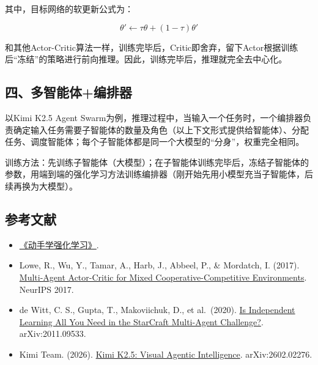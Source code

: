 其中，目标网络的软更新公式为：

\[
\theta'
\leftarrow
\tau\theta+(1-\tau)\theta'
\]

和其他Actor-Critic算法一样，训练完毕后，Critic即舍弃，留下Actor根据训练后``冻结''的策略进行前向推理。因此，训练完毕后，推理就完全去中心化。

\hypertarget{ux56dbux591aux667aux80fdux4f53ux7f16ux6392ux5668}{%
\subsection{四、多智能体+编排器}\label{ux56dbux591aux667aux80fdux4f53ux7f16ux6392ux5668}}

以Kimi K2.5 Agent Swarm为例，推理过程中，当输入一个任务时，一个编排器负责确定输入任务需要子智能体的数量及角色（以上下文形式提供给智能体）、分配任务、调度智能体；每个子智能体都是同一个大模型的``分身''，权重完全相同。

训练方法：先训练子智能体（大模型）；在子智能体训练完毕后，冻结子智能体的参数，用端到端的强化学习方法训练编排器（刚开始先用小模型充当子智能体，后续再换为大模型）。

\FloatBarrier
{}
\hypertarget{ux53c2ux8003ux6587ux732e-65}{%
\subsection{参考文献}\label{ux53c2ux8003ux6587ux732e-65}}

\vspace{0.25em}
\begin{itemize}
\tightlist
\item
  \href{https://hrl.boyuai.com/}{《动手学强化学习》}.
\item
  Lowe, R., Wu, Y., Tamar, A., Harb, J., Abbeel, P., \& Mordatch, I. (2017). \href{https://arxiv.org/abs/1706.02275}{Multi-Agent Actor-Critic for Mixed Cooperative-Competitive Environments}. NeurIPS 2017.
\item
  de Witt, C. S., Gupta, T., Makoviichuk, D., et al.~(2020). \href{https://arxiv.org/abs/2011.09533}{Is Independent Learning All You Need in the StarCraft Multi-Agent Challenge?}. arXiv:2011.09533.
\item
  Kimi Team. (2026). \href{https://arxiv.org/abs/2602.02276}{Kimi K2.5: Visual Agentic Intelligence}. arXiv:2602.02276.
\end{itemize}

\clearpage
